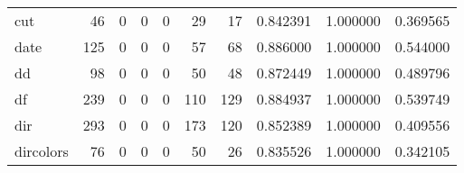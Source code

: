 \begin{tabular}{lrrrrrrrrr}
cut       &                                        46 &                                                  0 &                                                  0 &                                                  0 &                                                 29 &                                                 17 &                                           0.842391 &                               1.000000 &                             0.369565 \\
date      &                                       125 &                                                  0 &                                                  0 &                                                  0 &                                                 57 &                                                 68 &                                           0.886000 &                               1.000000 &                             0.544000 \\
dd        &                                        98 &                                                  0 &                                                  0 &                                                  0 &                                                 50 &                                                 48 &                                           0.872449 &                               1.000000 &                             0.489796 \\
df        &                                       239 &                                                  0 &                                                  0 &                                                  0 &                                                110 &                                                129 &                                           0.884937 &                               1.000000 &                             0.539749 \\
dir       &                                       293 &                                                  0 &                                                  0 &                                                  0 &                                                173 &                                                120 &                                           0.852389 &                               1.000000 &                             0.409556 \\
dircolors &                                        76 &                                                  0 &                                                  0 &                                                  0 &                                                 50 &                                                 26 &                                           0.835526 &                               1.000000 &                             0.342105 \\

\end{tabular}
